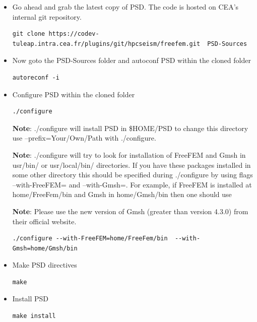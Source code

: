 \documentclass{report}
\begin{document}
\begin{itemize}
\item  Go ahead and grab the latest copy of PSD. The code is hosted on CEA's internal git repository.

\begin{lstlisting}[style=Linux]
git clone https://codev-tuleap.intra.cea.fr/plugins/git/hpcseism/freefem.git  PSD-Sources
\end{lstlisting}

\item  Now goto the {\ttfamily PSD-Sources} folder and autoconf PSD within the  cloned folder

\begin{lstlisting}[style=Linux]
autoreconf -i
\end{lstlisting}

\item Configure  PSD within the  cloned folder
\begin{lstlisting}[style=Linux]
./configure
\end{lstlisting}
\textbf{Note}:   {\ttfamily ./configure will} install PSD in {\ttfamily  \$HOME/PSD } to change this directory use {\ttfamily  --prefix=Your/Own/Path } with {\ttfamily ./configure}. 

\textbf{Note}:   {\ttfamily ./configure} will try to look for installation of {\ttfamily FreeFEM} and {\ttfamily Gmsh} in {\ttfamily usr/bin/} or {\ttfamily usr/local/bin/} directories. If you have these packages installed in some other directory this should be specified during {\ttfamily ./configure} by using flags {\ttfamily --with-FreeFEM=} and {\ttfamily --with-Gmsh=}. For example, if {\ttfamily FreeFEM} is installed at {\ttfamily home/FreeFem/bin} and {\ttfamily Gmsh} in {\ttfamily home/Gmsh/bin} then one should use

\textbf{Note}: Please use the new version of {\ttfamily Gmsh} (greater than version 4.3.0) from their official website.

\begin{lstlisting}[style=Linux]
./configure --with-FreeFEM=home/FreeFem/bin  --with-Gmsh=home/Gmsh/bin
\end{lstlisting}

\item Make PSD directives
\begin{lstlisting}[style=Linux]
make 
\end{lstlisting}


\item Install PSD
\begin{lstlisting}[style=Linux]
make install
\end{lstlisting}


\end{itemize}
\end{document}
